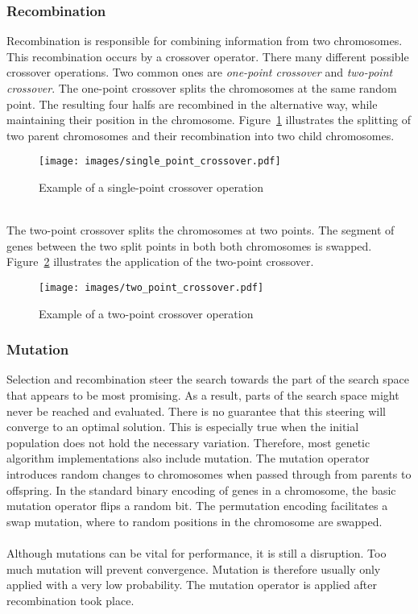\subsubsection{Recombination}
Recombination is responsible for combining information from two chromosomes.
This recombination occurs by a crossover operator. There many different
possible crossover operations. Two common ones are \emph{one-point crossover}
and \emph{two-point crossover}. The one-point crossover splits the chromosomes
at the same random point. The resulting four halfs are recombined in the
alternative way, while maintaining their position in the chromosome.
Figure~\ref{fig:single_point_crossover} illustrates the splitting of two parent
chromosomes and their recombination into two child chromosomes.\\
\begin{figure}[h]
	\centering
	\texttt{[image: images/single\_point\_crossover.pdf]}
	\caption{Example of a single-point crossover operation}
	\label{fig:single_point_crossover}
\end{figure}\\
\noindent
The two-point crossover splits the chromosomes at two points. The segment of
genes between the two split points in both both chromosomes is swapped.
Figure~\ref{fig:two_point_crossover} illustrates the application of the
two-point crossover.\\
\begin{figure}[h]
	\centering
	\texttt{[image: images/two\_point\_crossover.pdf]}
	\caption{Example of a two-point crossover operation}
	\label{fig:two_point_crossover}
\end{figure}%
\subsubsection{Mutation}
Selection and recombination steer the search towards the part of the search
space that appears to be most promising. As a result, parts of the search space
might never be reached and evaluated. There is no guarantee that this steering
will converge to an optimal solution. This is especially true when the initial
population does not hold the necessary variation. Therefore, most genetic algorithm
implementations also include mutation. The mutation operator introduces random
changes to chromosomes when passed through from parents to offspring. In the
standard binary encoding of genes in a chromosome, the basic mutation operator
flips a random bit. The permutation encoding facilitates a swap mutation, where
to random positions in the chromosome are swapped.\\\\
\noindent
Although mutations can be vital for performance, it is still a disruption. Too
much mutation will prevent convergence. Mutation is therefore usually only
applied with a very low probability. The mutation operator is applied after
recombination took place.
